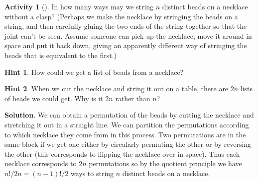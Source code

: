 \documentclass[10pt,]{book}
\theoremstyle{plain}
\theoremstyle{definition}
\theoremstyle{definition}
\theoremstyle{definition}
\newtheorem{activity}[project]{Activity}
\numberwithin{equation}{chapter}
\begin{document}
\begin{activity}[]\label{necklace}
\hypertarget{p-768}{}%
In how many ways may we string \(n\) distinct beads on a necklace without a clasp? (Perhaps we make the necklace by stringing the beads on a string, and then carefully gluing the two ends of the string together so that the joint can't be seen. Assume someone can pick up the necklace, move it around in space and put it back down, giving an apparently different way of stringing the beads that is equivalent to the first.)%
\par\smallskip%
\noindent\textbf{Hint 1}.\hypertarget{hint-65}{}\quad%
\hypertarget{p-769}{}%
How could we get a list of beads from a necklace?%
\par\smallskip%
\noindent\textbf{Hint 2}.\hypertarget{hint-66}{}\quad%
\hypertarget{p-770}{}%
When we cut the necklace and string it out on a table, there are \(2n\) lists of beads we could get. Why is it \(2n\) rather than \(n\)?%
\par\smallskip%
\noindent\textbf{Solution}.\hypertarget{solution-57}{}\quad%
\hypertarget{p-771}{}%
We can obtain a permutation of the beads by cutting the necklace and stretching it out in a straight line. We can partition the permutations according to which necklace they come from in this process. Two permutations are in the same block if we get one either by circularly permuting the other or by reversing the other (this corresponds to flipping the necklace over in space). Thus each necklace corresponds to \(2n\) permutations so by the quotient principle we have \(n!/2n=(n-1)!/2\) ways to string \(n\) distinct beads on a necklace.%
\end{activity}
\end{document}
